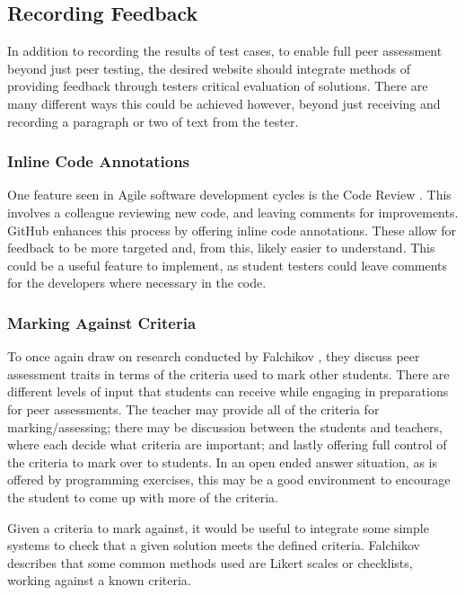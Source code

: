 \documentclass[a4paper,11pt]{report}
\begin{document}
\subsection{Recording Feedback}
In addition to recording the results of test cases, to enable full peer assessment beyond just peer testing, the desired website should integrate methods of providing feedback through testers critical evaluation of solutions. There are many different ways this could be achieved however, beyond just receiving and recording a paragraph or two of text from the tester.
\subsubsection*{Inline Code Annotations}
One feature seen in Agile software development cycles is the Code Review \cite{github_project_2016}. This involves a colleague reviewing new code, and leaving comments for improvements. GitHub enhances this process by offering inline code annotations. These allow for feedback to be more targeted and, from this, likely easier to understand. This could be a useful feature to implement, as student testers could leave comments for the developers where necessary in the code.
\subsubsection*{Marking Against Criteria} 
To once again draw on research conducted by Falchikov \cite{falchikov_improving_2013}, they discuss peer assessment traits in terms of the criteria used to mark other students. There are different levels of input that students can receive while engaging in preparations for peer assessments. The teacher may provide all of the criteria for marking/assessing; there may be discussion between the students and teachers, where each decide what criteria are important; and lastly offering full control of the criteria to mark over to students. In an open ended answer situation, as is offered by programming exercises, this may be a good environment to encourage the student to come up with more of the criteria.\par
Given a criteria to mark against, it would be useful to integrate some simple systems to check that a given solution meets the defined criteria. Falchikov describes that some common methods used are Likert scales or checklists, working against a known criteria.
\end{document}
